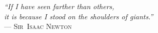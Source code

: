 {\sffamily\itshape
``If I have seen farther than others,\\
it is because I stood on the shoulders of giants.''\\}
--- \textsc{Sir~Isaac Newton}

